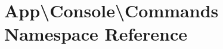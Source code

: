 \section{App\textbackslash{}Console\textbackslash{}Commands Namespace Reference}
\label{namespace_app_1_1_console_1_1_commands}
